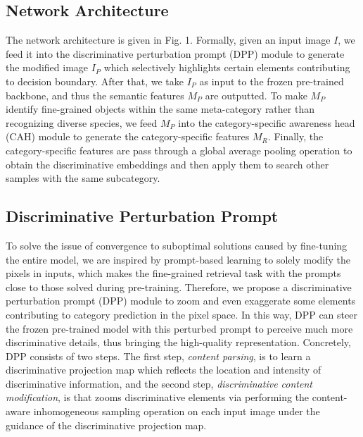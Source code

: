 \documentclass[letterpaper]{article} %
\begin{document}
\subsection{Network Architecture}
The network architecture is given in Fig. 1.
Formally, given an input image $ I $, we feed it into the discriminative perturbation prompt (DPP) module to generate the modified image $ I_P $ which selectively highlights certain elements contributing to decision boundary. After that, we take $ I_P $ as input to the frozen pre-trained backbone, and thus the semantic features $ M_P $ are outputted. 
To make $M_P$ identify fine-grained objects within the same meta-category rather than recognizing diverse species, we feed $ M_P $ into the category-specific awareness head (CAH) module to generate the category-specific features $ M_R $.  Finally, the category-specific features are pass through a global average pooling operation to obtain the discriminative embeddings and then apply them to search other samples with the same subcategory. %






\subsection{Discriminative Perturbation Prompt}
To solve the issue of convergence to suboptimal solutions caused by fine-tuning the entire model, we are inspired by prompt-based learning to solely modify the pixels in inputs, which makes the fine-grained retrieval task with the prompts close to those solved during pre-training.
Therefore, we propose a discriminative perturbation prompt (DPP) module to zoom and even exaggerate some elements contributing to category prediction in the pixel space. In this way, DPP can steer the frozen pre-trained model with this perturbed prompt to perceive much more discriminative details, thus bringing the high-quality representation.
Concretely, DPP consists of two steps. The first step, \textit{content parsing}, is to learn a discriminative projection map which reflects the location and intensity of discriminative information, and the second step, \textit{discriminative content modification}, is that zooms discriminative elements via performing the content-aware inhomogeneous sampling operation on each input image under the guidance of the discriminative projection map. 
\end{document}
